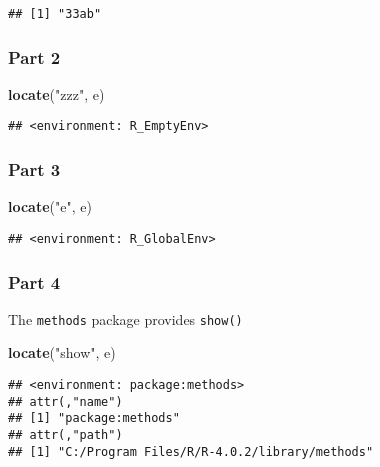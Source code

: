 \documentclass[
]{article}
\newenvironment{Shaded}{\begin{snugshade}}{\end{snugshade}}
\newcommand{\KeywordTok}[1]{\textcolor[rgb]{0.13,0.29,0.53}{\textbf{#1}}}
\newcommand{\NormalTok}[1]{#1}
\newcommand{\StringTok}[1]{\textcolor[rgb]{0.31,0.60,0.02}{#1}}
\begin{document}
\begin{verbatim}
## [1] "33ab"
\end{verbatim}

\hypertarget{part-2}{%
\subsubsection{Part 2}\label{part-2}}

\begin{Shaded}
\begin{Highlighting}[]
\KeywordTok{locate}\NormalTok{(}\StringTok{"zzz"}\NormalTok{, e)}
\end{Highlighting}
\end{Shaded}

\begin{verbatim}
## <environment: R_EmptyEnv>
\end{verbatim}

\hypertarget{part-3}{%
\subsubsection{Part 3}\label{part-3}}

\begin{Shaded}
\begin{Highlighting}[]
\KeywordTok{locate}\NormalTok{(}\StringTok{"e"}\NormalTok{, e)}
\end{Highlighting}
\end{Shaded}

\begin{verbatim}
## <environment: R_GlobalEnv>
\end{verbatim}

\hypertarget{part-4}{%
\subsubsection{Part 4}\label{part-4}}

The \texttt{methods} package provides \texttt{show()}

\begin{Shaded}
\begin{Highlighting}[]
\KeywordTok{locate}\NormalTok{(}\StringTok{"show"}\NormalTok{, e)}
\end{Highlighting}
\end{Shaded}

\begin{verbatim}
## <environment: package:methods>
## attr(,"name")
## [1] "package:methods"
## attr(,"path")
## [1] "C:/Program Files/R/R-4.0.2/library/methods"
\end{verbatim}
\end{document}
